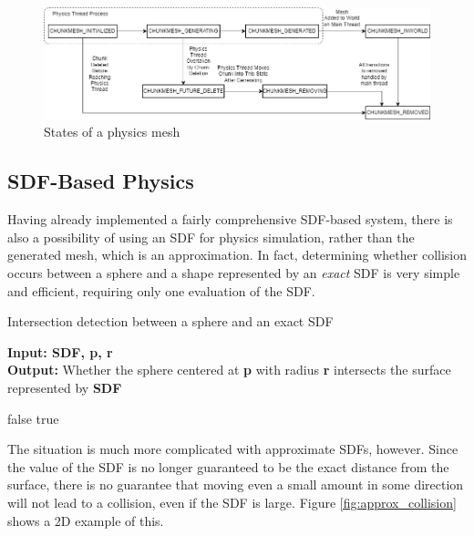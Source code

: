 \documentclass{article}
\begin{document}
 \begin{figure}[H]
  \includegraphics[width=\textwidth]{physics_states.png}
  \caption{States of a physics mesh}
  \label{fig:physics_states}
\end{figure}

\subsection{SDF-Based Physics}
Having already implemented a fairly comprehensive SDF-based system, there is also a possibility of using an SDF for physics simulation, rather than the generated mesh, which is an approximation. In fact, determining whether collision occurs between a sphere and a shape represented by an \textit{exact} SDF is very simple and efficient, requiring only one evaluation of the SDF.

\begin{algorithm}[H]
  \caption{Intersection detection between a sphere and an exact SDF}\label{alg:sdf_sphere_collision}
  \hspace*{\algorithmicindent} \textbf{Input: SDF, p, r} \\
  \hspace*{\algorithmicindent} \textbf{Output:} Whether the sphere centered at \textbf{p} with radius \textbf{r} intersects the surface represented by \textbf{SDF} 
  \begin{algorithmic}
   \State\Return false
  \Else \State \Return true
  \EndIf
  \end{algorithmic}
\end{algorithm}

The situation is much more complicated with approximate SDFs, however. Since the value of the SDF is no longer guaranteed to be the exact distance from the surface, there is no guarantee that moving even a small amount in some direction will not lead to a collision, even if the SDF is large. Figure \ref{fig:approx_collision} shows a 2D example of this.
\end{document}
